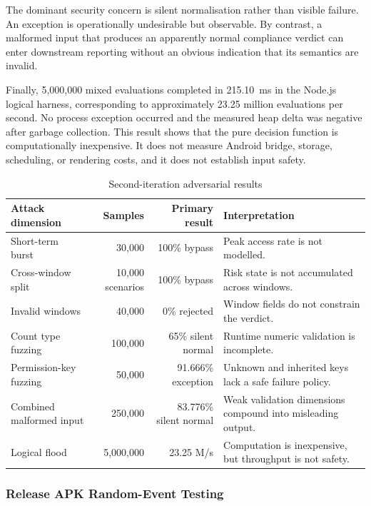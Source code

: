 The dominant security concern is silent normalisation rather than visible failure. An exception is operationally undesirable but observable. By contrast, a malformed input that produces an apparently normal compliance verdict can enter downstream reporting without an obvious indication that its semantics are invalid.

Finally, 5,000,000 mixed evaluations completed in 215.10~ms in the Node.js logical harness, corresponding to approximately 23.25 million evaluations per second. No process exception occurred and the measured heap delta was negative after garbage collection. This result shows that the pure decision function is computationally inexpensive. It does not measure Android bridge, storage, scheduling, or rendering costs, and it does not establish input safety.

\begin{table}[H]
\centering
\caption{Second-iteration adversarial results}
\label{tab:ch5-second-iteration}
\small
\begin{tabular}{p{3.0cm}rrp{5.8cm}}
\toprule
\textbf{Attack dimension} & \textbf{Samples} & \textbf{Primary result} & \textbf{Interpretation} \\
\midrule
Short-term burst & 30,000 & 100\% bypass & Peak access rate is not modelled. \\
Cross-window split & 10,000 scenarios & 100\% bypass & Risk state is not accumulated across windows. \\
Invalid windows & 40,000 & 0\% rejected & Window fields do not constrain the verdict. \\
Count type fuzzing & 100,000 & 65\% silent normal & Runtime numeric validation is incomplete. \\
Permission-key fuzzing & 50,000 & 91.666\% exception & Unknown and inherited keys lack a safe failure policy. \\
Combined malformed input & 250,000 & 83.776\% silent normal & Weak validation dimensions compound into misleading output. \\
Logical flood & 5,000,000 & 23.25 M/s & Computation is inexpensive, but throughput is not safety. \\
\bottomrule
\end{tabular}
\end{table}

\subsubsection{Release APK Random-Event Testing}

